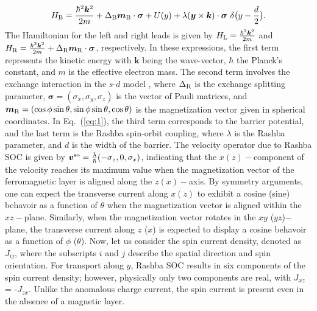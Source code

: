 \documentclass[10pt,pr,twocolumn,showpacs,amssymb,floatfix,superscriptaddress]{revtex4-1}
\newcommand{\dlt}{\delta}
\newcommand{\Dlt}{\Delta}
\newcommand{\lam}{\lambda}
\newcommand{\sg}{\sigma}
\begin{document}
\begin{equation}\label{eq:1}
H_{\rm B} =  \frac{\hbar^2 \bm k^2}{2m} + \Dlt_{\rm B}  \bm m_{\rm B} \cdot \bm \sg  + U(y) +  \lam (\bm y \times \bm k)\cdot  \bm \sg \mbox{ } \dlt \big(y- \frac{d}{2}\big).
\end{equation}
\noindent The Hamiltonian for the left and right leads is given by $H_{\rm L}= \frac{\hbar^2 \bm k^2}{2m}$ and $H_{\rm R} = \frac{\hbar^2 \bm k^2}{2m}+ \Delta_{\rm R}  \bm m_{\rm R} \cdot \bm \sigma$, respectively. In these expressions, the first term represents the kinetic energy with $\boldsymbol{k}$ being the wave-vector, $\hbar$ the Planck's constant, and $m$ is the effective electron mass. The second term involves the exchange interaction in the $s$-$d$ model \cite{Shubin1934}, where $\Delta_{\rm R}$ is the exchange splitting parameter, $\boldsymbol{\sigma}= (\sigma_{x},\sigma_{y},\sigma_{z})$ is the vector of Pauli matrices, and $\boldsymbol{m}_{\rm R} = (\cos\phi\sin\theta, \sin\phi\sin\theta,\cos\theta)$ is the magnetization vector given in spherical coordinates. In Eq.~(\ref{eq:1}), the third term corresponds to the barrier potential, and the last term is the Rashba spin-orbit coupling, where $\lambda$ is the Rashba parameter, and $d$ is the width of the barrier. The velocity operator due to Rashba SOC is given by $\bm v^{\rm so} = \frac{\lambda}{\hbar}(-\sigma_z,0,\sigma_x)$, indicating that the $x$$(z)-$component of the velocity reaches its maximum value when the magnetization vector of the ferromagnetic layer is aligned along the $z$$(x)-$axis. By symmetry arguments, one can expect the transverse current along $x$$(z)$ to exhibit a cosine (sine) behavoir as a function of $\theta$ when the magnetization vector is aligned within the $xz-$plane. Similarly, when the magnetization vector rotates in the $xy$ ($yz$)$-$plane, the transverse current along $z$ ($x$) is expected to display a cosine behavoir as a function of $\phi$ ($\theta$). Now, let us consider the spin current density, denoted as $J_{ij}$, where the subscripts $i$ and $j$ describe the spatial direction and spin orientation. For transport along $y$, Rashba SOC results in six components of the spin current density; however, physically only two components are real, with $J_{xz}$ = -$J_{zx}$. Unlike the anomalous charge current, the spin current is present even in the absence of a magnetic layer.
\end{document}
